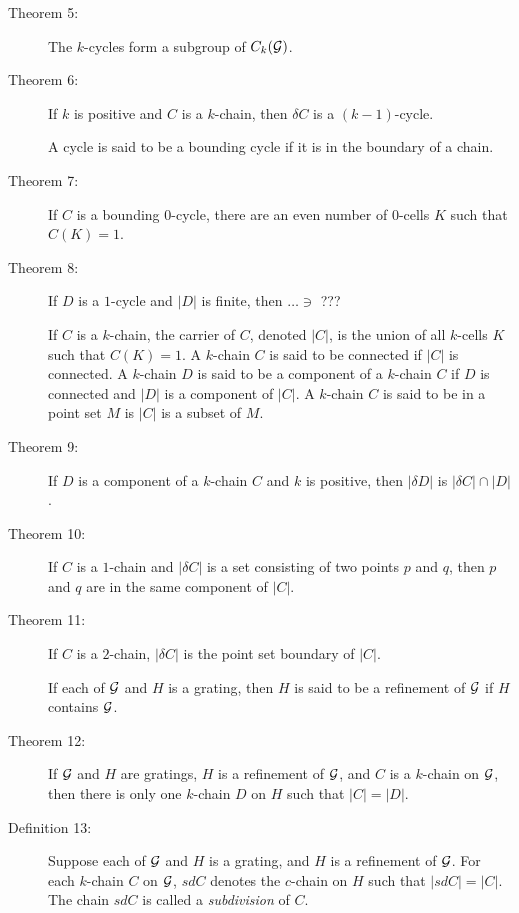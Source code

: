 \documentclass{article}
\begin{document}
\begin{description}
  \item[Theorem 5:] The $k$-cycles form a subgroup of $C_k({\cal G})$.

  \item[Theorem 6:] If $k$ is positive and $C$ is a $k$-chain, then $\delta C$ is a $(k-1)$-cycle.

  \item[] A cycle is said to be a bounding cycle if it is in the boundary of a chain.

  \item[Theorem 7:] If $C$ is a bounding $0$-cycle, there are an even number of $0$-cells $K$ such that $C(K) = 1$.

  \item[Theorem 8:] If $D$ is a $1$-cycle and $|D|$ is finite, then $\ldots \ni$ ???

  \item[] If $C$ is a $k$-chain, the carrier of $C$, denoted $|C|$, is the union of all $k$-cells $K$ such that $C(K)=1$. A $k$-chain $C$ is said to be connected if $|C|$ is connected. A $k$-chain $D$ is said to be a component of a $k$-chain $C$ if $D$ is connected and $|D|$ is a component of $|C|$. A $k$-chain $C$ is said to be in a point set $M$ is $|C|$ is a subset of $M$.

  \item[Theorem 9:] If $D$ is a component of a $k$-chain $C$ and $k$ is positive, then $|\delta D|$ is $|\delta C| \cap |D|$.

  \item[Theorem 10:] If $C$ is a $1$-chain and $|\delta C|$ is a set consisting of two points $p$ and $q$, then $p$ and $q$ are in the same component of $|C|$.

  \item[Theorem 11:] If $C$ is a $2$-chain, $|\delta C|$ is the point set boundary of $|C|$.

  \item[] If each of ${\cal G}$ and $H$ is a grating, then $H$ is said to be a refinement of ${\cal G}$ if $H$ contains ${\cal G}$.

  \item[Theorem 12:] If ${\cal G}$ and $H$ are gratings, $H$ is a refinement of ${\cal G}$, and $C$ is a $k$-chain on ${\cal G}$, then there is only one $k$-chain $D$ on $H$ such that $|C| = |D|$.

  \item[Definition 13:] Suppose each of ${\cal G}$ and $H$ is a grating, and $H$ is a refinement of ${\cal G}$. For each $k$-chain $C$ on ${\cal G}$, $sdC$ denotes the $c$-chain on $H$ such that $|sdC| = |C|$. The chain $sdC$ is called a \emph{subdivision} of $C$.


\end{description}
\end{document}
